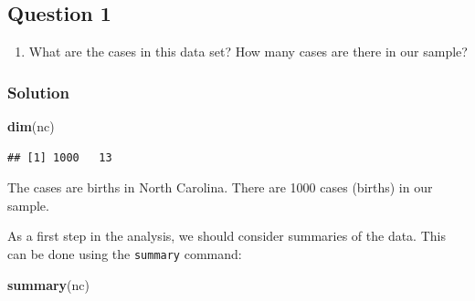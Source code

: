 \documentclass[]{article}
\newenvironment{Shaded}{\begin{snugshade}}{\end{snugshade}}
\newcommand{\KeywordTok}[1]{\textcolor[rgb]{0.13,0.29,0.53}{\textbf{#1}}}
\newcommand{\NormalTok}[1]{#1}
\providecommand{\tightlist}{%
  \setlength{\itemsep}{0pt}\setlength{\parskip}{0pt}}
\begin{document}
\subsection{Question 1}\label{question-1}

\begin{enumerate}
\def\labelenumi{\arabic{enumi}.}
\tightlist
\item
  What are the cases in this data set? How many cases are there in our
  sample?
\end{enumerate}

\subsubsection{Solution}\label{solution}

\begin{Shaded}
\begin{Highlighting}[]
\KeywordTok{dim}\NormalTok{(nc)}
\end{Highlighting}
\end{Shaded}

\begin{verbatim}
## [1] 1000   13
\end{verbatim}

The cases are births in North Carolina. There are 1000 cases (births) in
our sample.

As a first step in the analysis, we should consider summaries of the
data. This can be done using the \texttt{summary} command:

\begin{Shaded}
\begin{Highlighting}[]
\KeywordTok{summary}\NormalTok{(nc)}
\end{Highlighting}
\end{Shaded}
\end{document}
